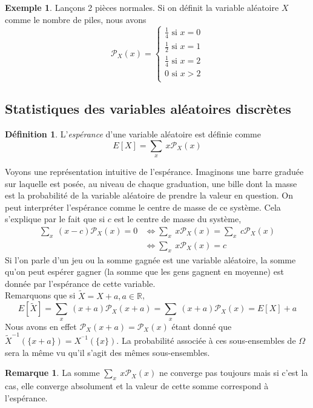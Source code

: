\documentclass[a4paper,12pt]{report}
\theoremstyle{definition}
\newcommand{\R}{\mathbb{R}}
\renewcommand{\(}{\left(}
\renewcommand{\)}{\right)}
\renewcommand{\P}{\mathcal{P}}
\renewcommand{\t}{\text}
\renewcommand{\d}{\textit}
\newtheorem{defn}[thm]{Définition}
\newtheorem{rmk}[thm]{Remarque}
\newtheorem{exmp}[thm]{Exemple}
\begin{document}
        \begin{exmp}
            Lançons 2 pièces normales. Si on définit la variable aléatoire $X$ comme le nombre de piles, nous avons
            $$\P_X(x) = 
            \begin{cases}
            \frac{1}{4} \t{ si } x = 0 \\
            \frac{1}{2} \t{ si } x = 1 \\
            \frac{1}{4} \t{ si } x = 2 \\
            0 \t{ si } x > 2 \\
            \end{cases}
            $$
        \end{exmp}

        \subsection{Statistiques des variables aléatoires discrètes}
        
            \begin{leftbar}
                \begin{defn}
                    L'\d{espérance} d'une variable aléatoire est définie comme
                    $$E[X] = \sum_x ~x\P_X(x)$$
                \end{defn}
            \end{leftbar}
            
            Voyons une représentation intuitive de l'espérance. Imaginons une barre graduée sur laquelle est posée, au niveau de chaque graduation, une bille dont la masse est la probabilité de la variable aléatoire de prendre la valeur en question. On peut interpréter l'espérance comme le centre de masse de ce système. Cela s'explique par le fait que si $c$ est le centre de masse du système,
            \begin{align*}
                \sum_x ~(x-c)\P_X(x) = 0 &\Leftrightarrow \sum_x ~x\P_X(x) = \sum_x ~c\P_X(x) \\
                &\Leftrightarrow \sum_x ~x\P_X(x) = c
            \end{align*}
            Si l'on parle d'un jeu ou la somme gagnée est une variable aléatoire, la somme qu'on peut espérer gagner (la somme que les gens gagnent en moyenne) est donnée par l'espérance de cette variable.\\
            
            Remarquons que si $\tilde{X} = X + a, a\in \R$,
            $$E[\tilde{X}] = \sum_x ~(x+a)\P_X(x+a) = \sum_x ~(x+a)\P_X(x) =E[X] + a$$
            Nous avons en effet $\P_X(x+a)= \P_X(x)$ étant donné que $\tilde{X}^{-1}(\{x+a\}) = X^{^-1}(\{x\})$. La probabilité associée à ces sous-ensembles de $\Omega$ sera la même vu qu'il s'agit des mêmes sous-ensembles.
            \begin{rmk}
                La somme $\sum_x ~x\P_X(x)$ ne converge pas toujours mais si c'est la cas, elle converge absolument et la valeur de cette somme correspond à l'espérance.
            \end{rmk}
            
\end{document}
